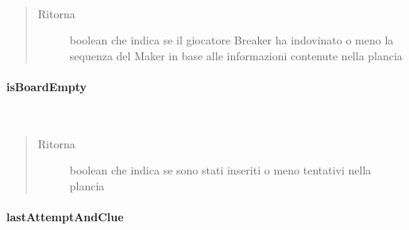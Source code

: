 \documentclass[letterpaper,10pt,italian]{sphinxmanual}
\begin{document}
\begin{fulllineitems}
\label{\detokenize{source/it/unicam/cs/pa/mastermind/gamecore/BoardModel:it.unicam.cs.pa.mastermind.gamecore.BoardModel.hasBreakerGuessed()}}~\begin{quote}\begin{description}
\item[{Ritorna}] \leavevmode
boolean che indica se il giocatore Breaker ha indovinato o meno la sequenza del Maker in base alle informazioni contenute nella plancia

\end{description}\end{quote}

\end{fulllineitems}



\paragraph{isBoardEmpty}
\label{\detokenize{source/it/unicam/cs/pa/mastermind/gamecore/BoardModel:isboardempty}}

\begin{fulllineitems}
\label{\detokenize{source/it/unicam/cs/pa/mastermind/gamecore/BoardModel:it.unicam.cs.pa.mastermind.gamecore.BoardModel.isBoardEmpty()}}~\begin{quote}\begin{description}
\item[{Ritorna}] \leavevmode
boolean che indica se sono stati inseriti o meno tentativi nella plancia

\end{description}\end{quote}

\end{fulllineitems}



\paragraph{lastAttemptAndClue}
\label{\detokenize{source/it/unicam/cs/pa/mastermind/gamecore/BoardModel:lastattemptandclue}}
\end{document}
